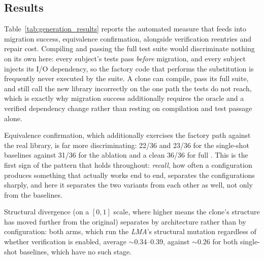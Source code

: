 \subsection{Results}

Table~\ref{tab:generation_results} reports the automated measure that feeds into migration success, equivalence confirmation, alongside verification reentries and repair cost. Compiling and passing the full test suite would discriminate nothing on its own here: every subject's tests pass \emph{before} migration, and every subject injects its I/O dependency, so the factory code that performs the substitution is frequently never executed by the suite. A clone can compile, pass its full suite, and still call the new library incorrectly on the one path the tests do not reach, which is exactly why migration success additionally requires the oracle and a verified dependency change rather than resting on compilation and test passage alone.

Equivalence confirmation, which additionally exercises the factory path against the real library, is far more discriminating: 22/36 and 23/36 for the single-shot baselines against 31/36 for the ablation and a clean 36/36 for full \sys. This is the first sign of the pattern that holds throughout: \emph{recall}, how often a configuration produces something that actually works end to end, separates the configurations sharply, and here it separates the two \sys variants from each other as well, not only from the baselines.

Structural divergence (on a $[0,1]$ scale, where higher means the clone's structure has moved further from the original) separates by architecture rather than by configuration: both \sys arms, which run the \emph{LMA}'s structural mutation regardless of whether verification is enabled, average $\sim$0.34--0.39, against $\sim$0.26 for both single-shot baselines, which have no such stage.

